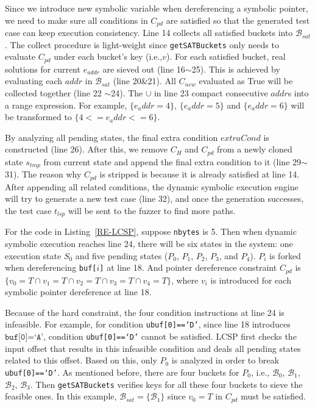 Since we introduce new symbolic variable when dereferencing a symbolic pointer,
we need to make sure all conditions in $C_{pd}$ are satisfied so that the generated
test case can keep execution consistency.
Line 14 collects all satisfied buckets into $\mathcal{B}_{sat}$. The collect procedure
is light-weight since \texttt{getSATBuckets} only needs to evaluate $C_{pd}$
under each bucket's key (i.e.,$v$).
For each satisfied bucket, real solutions for current $e_{addr}$ are sieved out 
(line 16$\sim$25). This is achieved by evaluating each $addr$ in $\mathcal{B}_{sat}$
(line 20\&21). All $C_{new}$ evaluated as True will be collected together (line 22
$\sim$24). The $\cup$ in line 23 compact consecutive $addr$s into a range expression.
For example, $\{e_addr=4\}$, $\{e_addr=5\}$ and $\{e_addr=6\}$ will be transformed to
$\{4<=e_addr<=6\}$.

By analyzing all pending states, the final extra condition $extraCond$ is constructed
(line 26).
After this, we remove $C_H$ and $C_{pd}$ from a newly cloned state $s_{tmp}$
from current state and append
the final extra condition to it (line 29$\sim$31). 
The reason why $C_{pd}$ is stripped is because it is already satisfied at line 14.
After appending all related conditions, the dynamic symbolic execution 
engine will try to generate a new test case (line 32), and once the 
generation successes, the test case $t_{lsp}$ will be sent to the 
fuzzer to find more paths.

For the code in Listing~\ref{RE-LCSP}, suppose \texttt{nbytes} is 5. 
Then when dynamic symbolic execution reaches line 24, there will be 
six states in the system: one execution state $S_0$ and five pending 
states ($P_0$, $P_1$, $P_2$, $P_3$, and $P_4$). $P_i$ is forked when 
dereferencing \texttt{buf[$i$]} at line 18. And pointer dereference
constraint $C_{pd}$ is $\{v_0=T\cap v_1=T\cap v_2=T\cap v_3=T\cap v_4=T\}$,
where $v_i$ is introduced for each symbolic pointer dereference at
line 18.

Because of the hard constraint, the four condition instructions at line 24
is infeasible. 
For example, for condition \texttt{ubuf[0]==`D'}, since line
18 introduces $\texttt{buf[0]=`A'}$, condition \texttt{ubuf[0]==`D'} cannot
be satisfied. LCSP first checks the input offset that results in this infeasible
condition and deals all pending states related to this offset. Based on this,
only $P_0$ is analyzed in order to break \texttt{ubuf[0]==`D'}. As mentioned before,
there are four buckets for $P_0$, i.e., $\mathcal{B}_0$, $\mathcal{B}_1$, $\mathcal{B}_2$,
$\mathcal{B}_3$. Then \texttt{getSATBuckets} verifies keys for all these four buckets 
to sieve the feasible ones. In this example, $\mathcal{B}_{sat}=\{\mathcal{B}_1\}$ since
$v_0=T$ in $C_{pd}$ must be satisfied. 

